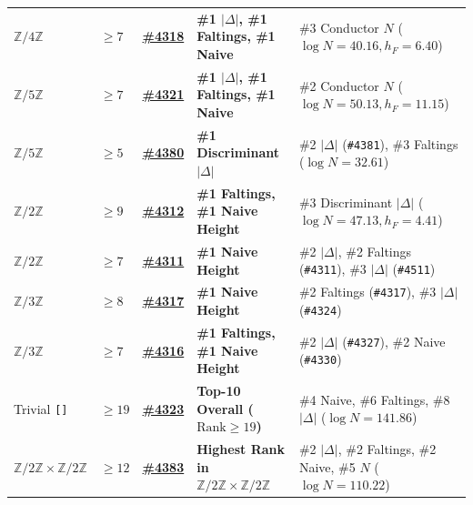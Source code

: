 \documentclass[10pt,a4paper]{article}
\theoremstyle{plain}
\theoremstyle{definition}
\theoremstyle{remark}
\begin{document}
\begin{table}[htbp]
\begin{tabularx}{\textwidth}{llcp{4.8cm}X}
\addlinespace[1.5pt]
$\mathbb{Z}/4\mathbb{Z}$ & $\ge 7$ & \href{https://elliptic-rank.icarm.cloud/curve/4318}{\textbf{\#4318}} & \textbf{\#1 $|\Delta|$, \#1 Faltings, \#1 Naive} & \#3 Conductor $N$ ($\log N = 40.16, h_F = 6.40$) \\
\addlinespace[1.5pt]
$\mathbb{Z}/5\mathbb{Z}$ & $\ge 7$ & \href{https://elliptic-rank.icarm.cloud/curve/4321}{\textbf{\#4321}} & \textbf{\#1 $|\Delta|$, \#1 Faltings, \#1 Naive} & \#2 Conductor $N$ ($\log N = 50.13, h_F = 11.15$) \\
\addlinespace[1.5pt]
$\mathbb{Z}/5\mathbb{Z}$ & $\ge 5$ & \href{https://elliptic-rank.icarm.cloud/curve/4380}{\textbf{\#4380}} & \textbf{\#1 Discriminant $|\Delta|$} & \#2 $|\Delta|$ (\texttt{\#4381}), \#3 Faltings ($\log N = 32.61$) \\
\addlinespace[1.5pt]
$\mathbb{Z}/2\mathbb{Z}$ & $\ge 9$ & \href{https://elliptic-rank.icarm.cloud/curve/4312}{\textbf{\#4312}} & \textbf{\#1 Faltings, \#1 Naive Height} & \#3 Discriminant $|\Delta|$ ($\log N = 47.13, h_F = 4.41$) \\
\addlinespace[1.5pt]
$\mathbb{Z}/2\mathbb{Z}$ & $\ge 7$ & \href{https://elliptic-rank.icarm.cloud/curve/4311}{\textbf{\#4311}} & \textbf{\#1 Naive Height} & \#2 $|\Delta|$, \#2 Faltings (\texttt{\#4311}), \#3 $|\Delta|$ (\texttt{\#4511}) \\
\addlinespace[1.5pt]
$\mathbb{Z}/3\mathbb{Z}$ & $\ge 8$ & \href{https://elliptic-rank.icarm.cloud/curve/4317}{\textbf{\#4317}} & \textbf{\#1 Naive Height} & \#2 Faltings (\texttt{\#4317}), \#3 $|\Delta|$ (\texttt{\#4324}) \\
\addlinespace[1.5pt]
$\mathbb{Z}/3\mathbb{Z}$ & $\ge 7$ & \href{https://elliptic-rank.icarm.cloud/curve/4316}{\textbf{\#4316}} & \textbf{\#1 Faltings, \#1 Naive Height} & \#2 $|\Delta|$ (\texttt{\#4327}), \#2 Naive (\texttt{\#4330}) \\
\addlinespace[1.5pt]
Trivial \texttt{[]} & $\ge 19$ & \href{https://elliptic-rank.icarm.cloud/curve/4323}{\textbf{\#4323}} & \textbf{Top-10 Overall ($\mathrm{Rank} \ge 19$)} & \#4 Naive, \#6 Faltings, \#8 $|\Delta|$ ($\log N = 141.86$) \\
\addlinespace[1.5pt]
$\mathbb{Z}/2\mathbb{Z} \times \mathbb{Z}/2\mathbb{Z}$ & $\ge 12$ & \href{https://elliptic-rank.icarm.cloud/curve/4383}{\textbf{\#4383}} & \textbf{Highest Rank in $\mathbb{Z}/2\mathbb{Z} \times \mathbb{Z}/2\mathbb{Z}$} & \#2 $|\Delta|$, \#2 Faltings, \#2 Naive, \#5 $N$ ($\log N = 110.22$) \\
\bottomrule
\end{tabularx}
\end{table}
\end{document}
